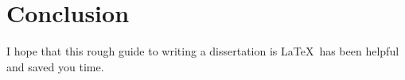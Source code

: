 \documentclass[12pt,a4paper,twoside,openright]{report}
\begin{document}
\chapter{Conclusion}

I hope that this rough guide to writing a dissertation is \LaTeX\ has
been helpful and saved you time.













% 
\end{document}
